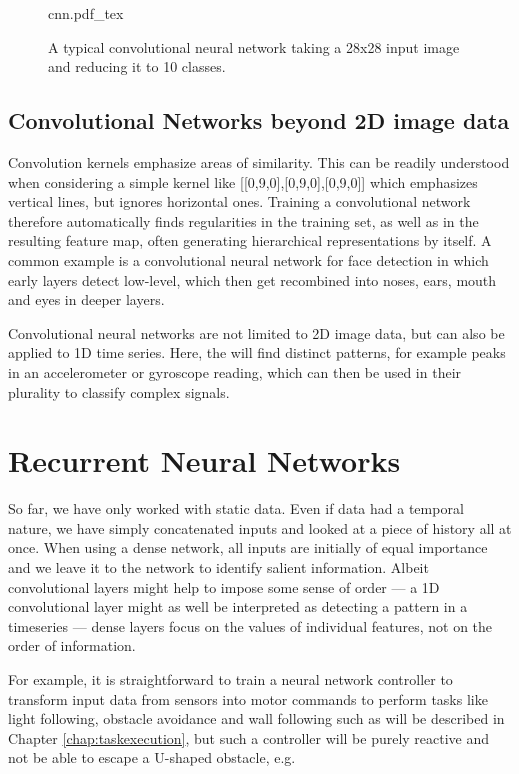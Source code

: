 \begin{figure}[htb]
\tiny
    \centering
    \def\svgwidth{\textwidth}
    {cnn.pdf_tex}
    \caption{A typical convolutional neural network taking a 28x28 input image and reducing it to 10 classes.\label{fig:cnn}}
\end{figure}


\subsection{Convolutional Networks beyond 2D image data}

Convolution kernels emphasize areas of similarity. This can be readily understood when considering a simple kernel like [[0,9,0],[0,9,0],[0,9,0]] which emphasizes vertical lines, but ignores horizontal ones. Training a convolutional network therefore automatically finds regularities in the training set, as well as in the resulting feature map, often generating hierarchical representations by itself. A common example is a convolutional neural network for face detection in which early layers detect low-level, which then get recombined into noses, ears, mouth and eyes in deeper layers.

Convolutional neural networks are not limited to 2D image data, but can also be applied to 1D time series. Here, the will find distinct patterns, for example peaks in an accelerometer or gyroscope reading, which can then be used in their plurality to classify complex signals. 

\section{Recurrent Neural Networks}
So far, we have only worked with static data. Even if data had a temporal nature, we have simply concatenated inputs and looked at a piece of history all at once. When using a dense network, all inputs are initially of equal importance and we leave it to the network to identify salient information. Albeit convolutional layers might help to impose some sense of order --- a 1D convolutional layer might as well be interpreted as detecting a pattern in a timeseries --- dense layers focus on the values of individual features, not on the order of information. 

For example, it is straightforward to train a neural network controller to transform input data from sensors into motor commands to perform tasks like light following, obstacle avoidance and wall following such as will be described in Chapter \ref{chap:taskexecution}, but such a controller will be purely reactive and not be able to escape a U-shaped obstacle, e.g.

